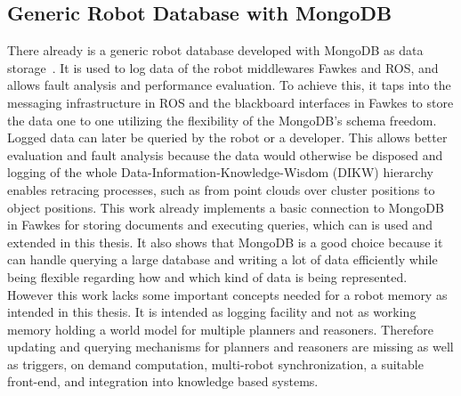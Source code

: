 \subsection{Generic Robot Database with MongoDB}
\label{sec:mongo-logging}
There already is a generic robot database developed with MongoDB as
data storage~\cite{RoboDB}. It is used to log data of the robot
middlewares Fawkes and ROS, and allows fault analysis and performance
evaluation. To achieve this, it taps into the messaging infrastructure
in ROS and the blackboard interfaces in Fawkes to store the data one
to one utilizing the flexibility of the MongoDB's schema
freedom. Logged data can later be queried by the robot or a
developer. This allows better evaluation and fault analysis because
the data would otherwise be disposed and logging of the whole
Data-Information-Knowledge-Wisdom (DIKW) hierarchy~\cite{DIKW} enables
retracing processes, such as from point clouds over cluster
positions to object positions. This work already
implements a basic connection to MongoDB in Fawkes for storing
documents and executing queries, which can is used and extended in
this thesis. It also shows that MongoDB is a good choice because it
can handle querying a large database and writing a lot of data
efficiently while being flexible regarding how and which kind of data
is being represented.  However this work lacks some important concepts
needed for a robot memory as intended in this thesis. It is intended
as logging facility and not as working memory holding a world model
for multiple planners and reasoners. Therefore updating and querying
mechanisms for planners and reasoners are missing as well as triggers,
on demand computation, multi-robot synchronization, a
suitable front-end, and integration into knowledge based systems.

